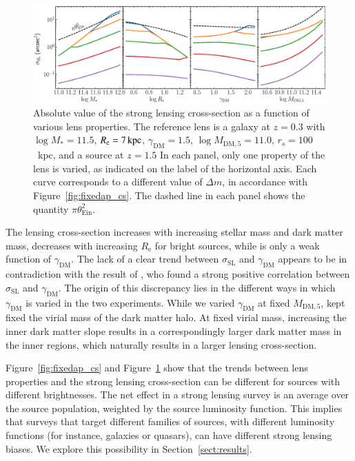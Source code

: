 \documentclass{aa}
\def\reff{R_{\mathrm{e}}}
\def\mstar{M_*}
\def\gammadm{\gamma_{\mathrm{DM}}}
\def\mdmfive{M_{\mathrm{DM}, 5}}
\def\tein{\theta_{\mathrm{Ein}}}
\def\crosssect{\sigma_\mathrm{{SL}}}
\def\Sref#1{Section~\ref{#1}\xspace}
\def\Fref#1{Figure~\ref{#1}\xspace}
\begin{document}
\begin{figure}
\includegraphics[width=\textwidth]{axisymm_composite_physical_crosssect.eps}
\caption{
Absolute value of the strong lensing cross-section as a function of various lens properties.
The reference lens is a galaxy at $z=0.3$ with $\log{\mstar}=11.5$, $\reff=7\,{\rm kpc}$, $\gammadm=1.5$, $\log{\mdmfive}=11.0$, $r_s=100$~kpc, and a source at $z=1.5$
In each panel, only one property of the lens is varied, as indicated on the label of the horizontal axis.
Each curve corresponds to a different value of $\Delta m$, in accordance with \Fref{fig:fixedap_cs}.
The dashed line in each panel shows the quantity $\pi\tein^2$.
\label{fig:phys_cs}
}
\end{figure}

The lensing cross-section increases with increasing stellar mass and dark matter mass, decreases with increasing $\reff$ for bright sources, while is only a weak function of $\gammadm$. 
The lack of a clear trend between $\crosssect$ and $\gammadm$ appears to be in contradiction with the result of \citet{MVK09}, who found a strong positive correlation between $\crosssect$ and $\gammadm$.
The origin of this discrepancy lies in the different ways in which $\gammadm$ is varied in the two experiments. While we varied $\gammadm$ at fixed $\mdmfive$, \citet{MVK09} kept fixed the virial mass of the dark matter halo. At fixed virial mass, increasing the inner dark matter slope results in a correspondingly larger dark matter mass in the inner regions, which naturally results in a larger lensing cross-section.

\Fref{fig:fixedap_cs} and \Fref{fig:phys_cs} show that the trends between lens properties and the strong lensing cross-section can be different for sources with different brightnesses.
The net effect in a strong lensing survey is an average over the source population, weighted by the source luminosity function. 
This implies that surveys that target different families of sources, with different luminosity functions (for instance, galaxies or quasars), can have different strong lensing biases. We explore this possibility in \Sref{sect:results}.
\end{document}
